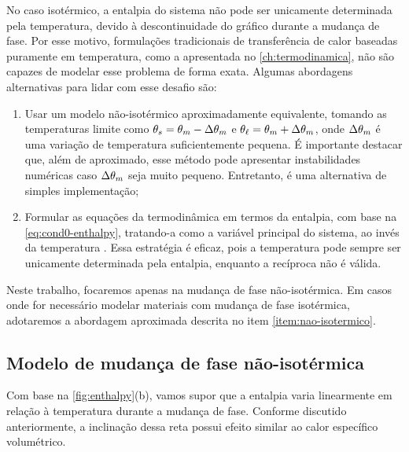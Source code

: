 \documentclass[Tese.tex]{subfiles}
\begin{document}
No caso isotérmico, a entalpia do sistema não pode ser unicamente determinada pela temperatura, devido à descontinuidade do gráfico durante a mudança de fase. Por esse motivo, formulações tradicionais de transferência de calor baseadas puramente em temperatura, como a apresentada no \cref{ch:termodinamica}, não são capazes de modelar esse problema de forma exata. Algumas abordagens alternativas para lidar com esse desafio são:
\begin{enumerate}[label=(\alph*)]
	\item Usar um modelo não-isotérmico aproximadamente equivalente, tomando as temperaturas limite como $\theta_s = \theta_m - \Delta\theta_m$ e $\theta_\ell = \theta_m + \Delta\theta_m$, onde $\Delta\theta_m$ é uma variação de temperatura suficientemente pequena. É importante destacar que, além de aproximado, esse método pode apresentar instabilidades numéricas caso $\Delta\theta_m$ seja muito pequeno. Entretanto, é uma alternativa de simples implementação;\label{item:nao-isotermico}
	\item Formular as equações da termodinâmica em termos da entalpia, com base na \cref{eq:cond0-enthalpy}, tratando-a como a variável principal do sistema, ao invés da temperatura \cite{NEDJAR20029}. Essa estratégia é eficaz, pois a temperatura pode sempre ser unicamente determinada pela entalpia, enquanto a recíproca não é válida.
\end{enumerate}

Neste trabalho, focaremos apenas na mudança de fase não-isotérmica. Em casos onde for necessário modelar materiais com mudança de fase isotérmica, adotaremos a abordagem aproximada descrita no item \ref{item:nao-isotermico}.

\subsection{Modelo de mudança de fase não-isotérmica}\label{sec:mudanca-nao-isotermica}

Com base na \cref{fig:enthalpy}(b), vamos supor que a entalpia varia linearmente em relação à temperatura durante a mudança de fase. Conforme discutido anteriormente, a inclinação dessa reta possui efeito similar ao calor específico volumétrico. 
\end{document}
